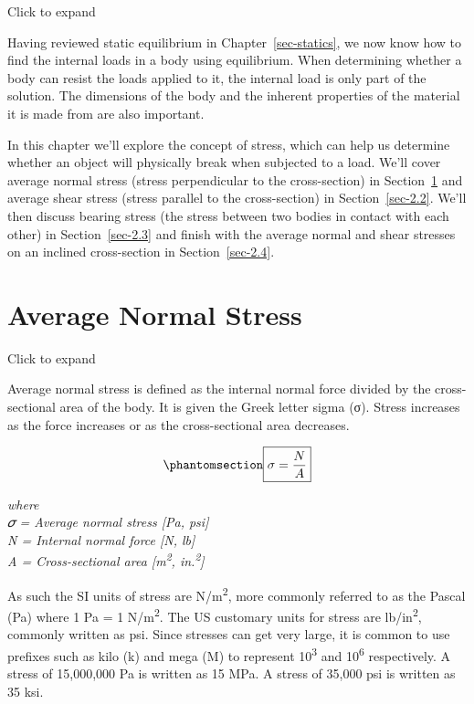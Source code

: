 \documentclass[
  letterpaper,
  DIV=11,
  numbers=noendperiod]{scrreprt}
\theoremstyle{definition}
\theoremstyle{remark}
\begin{document}

Click to expand

Having reviewed static equilibrium in Chapter~\ref{sec-statics}, we now
know how to find the internal loads in a body using equilibrium. When
determining whether a body can resist the loads applied to it, the
internal load is only part of the solution. The dimensions of the body
and the inherent properties of the material it is made from are also
important.

In this chapter we'll explore the concept of stress, which can help us
determine whether an object will physically break when subjected to a
load. We'll cover average normal stress (stress perpendicular to the
cross-section) in Section~\ref{sec-2.1} and average shear stress (stress
parallel to the cross-section) in Section~\ref{sec-2.2}. We'll then
discuss bearing stress (the stress between two bodies in contact with
each other) in Section~\ref{sec-2.3} and finish with the average normal
and shear stresses on an inclined cross-section in
Section~\ref{sec-2.4}.

\section{Average Normal Stress}\label{sec-2.1}

Click to expand

Average normal stress is defined as the internal normal force divided by
the cross-sectional area of the body. It is given the Greek letter sigma
(σ). Stress increases as the force increases or as the cross-sectional
area decreases.

\begin{equation}\phantomsection\label{eq-2.1}{
\boxed
{\sigma=\frac{N}{A}}
}\end{equation}

\emph{where}\\
\emph{𝜎 = Average normal stress {[}Pa, psi{]}}\\
\emph{N = Internal normal force {[}N, lb{]}}\\
\emph{A = Cross-sectional area {[}m\textsuperscript{2},
in.\textsuperscript{2}{]}}

As such the SI units of stress are N/m\textsuperscript{2}, more commonly
referred to as the Pascal (Pa) where 1 Pa = 1 N/m\textsuperscript{2}.
The US customary units for stress are lb/in\textsuperscript{2}, commonly
written as psi. Since stresses can get very large, it is common to use
prefixes such as kilo (k) and mega (M) to represent
10\textsuperscript{3} and 10\textsuperscript{6} respectively. A stress
of 15,000,000 Pa is written as 15 MPa. A stress of 35,000 psi is written
as 35 ksi.
\end{document}
